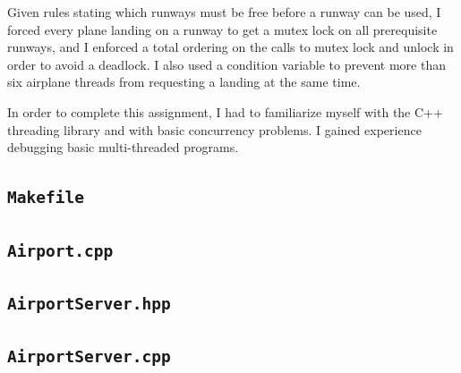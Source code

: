 \documentclass[12pt]{article}
\begin{document}
Given rules stating which runways must be free before a runway can be used, I forced every plane landing on a runway to get a mutex lock on all prerequisite runways, and I enforced a total ordering on the calls to mutex lock and unlock in order to avoid a deadlock. I also used a condition variable to prevent more than six airplane threads from requesting a landing at the same time.

In order to complete this assignment, I had to familiarize myself with the C++ threading library and with basic concurrency problems. I gained experience debugging basic multi-threaded programs.

\subsection{\texttt{Makefile}}



\subsection{\texttt{Airport.cpp}}



\subsection{\texttt{AirportServer.hpp}}



\subsection{\texttt{AirportServer.cpp}}


\end{document}
